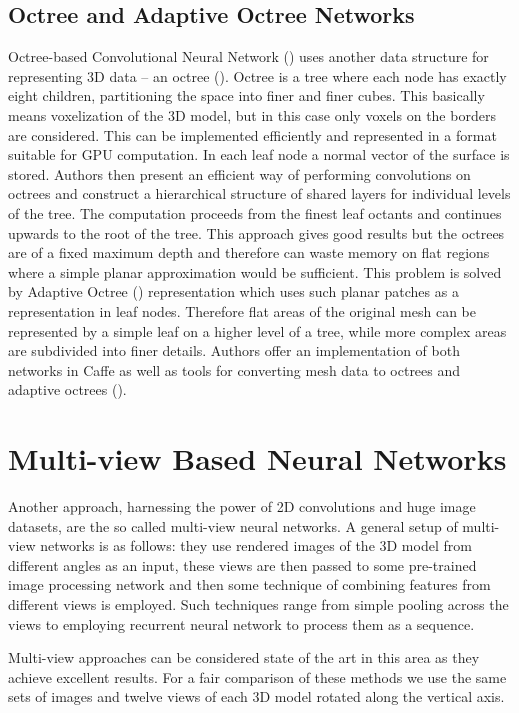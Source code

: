 


\subsection{Octree and Adaptive Octree Networks}
Octree-based Convolutional Neural Network (\cite{wang_o-cnn:_2017}) uses another data structure for representing 3D data -- an octree (\cite{meagher_octree_1980}). Octree is a tree where each node has exactly eight children, partitioning the space into finer and finer cubes. This basically means voxelization of the 3D model, but in this case only voxels on the borders are considered. This can be implemented efficiently and represented in a format suitable for GPU computation. In each leaf node a normal vector of the surface is stored. Authors then present an efficient way of performing convolutions on octrees and construct a hierarchical structure of shared layers for individual levels of the tree. The computation proceeds from the finest leaf octants and continues upwards to the root of the tree.
This approach gives good results but the octrees are of a fixed maximum depth and therefore can waste memory on flat regions where a simple planar approximation would be sufficient. This problem is solved by Adaptive Octree (\cite{wang_adaptive_2018}) representation which uses such planar patches as a representation in leaf nodes. Therefore flat areas of the original mesh can be represented by a simple leaf on a higher level of a tree, while more complex areas are subdivided into finer details. 
Authors offer an implementation of both networks in Caffe as well as tools for converting mesh data to octrees and adaptive octrees (\cite{wang_o-cnn_2018}).

\section{Multi-view Based Neural Networks}
Another approach, harnessing the power of 2D convolutions and huge image datasets, are the so called multi-view neural networks.
A general setup of multi-view networks is as follows: they use rendered images of the 3D model from different angles as an input, these views are then passed to some pre-trained image processing network and then some technique of combining features from different views is employed. Such techniques range from simple pooling across the views to employing recurrent neural network to process them as a sequence.\par
Multi-view approaches can be considered state of the art in this area as they achieve excellent results. For a fair comparison of these methods we use the same sets of images and twelve views of each 3D model rotated along the vertical axis.

